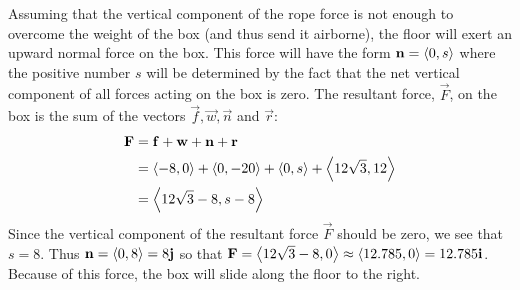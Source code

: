 \documentclass[handout]{ximera}
\begin{document}
\begin{example}[Example 6]
Assuming that the vertical component of the rope force is not enough to overcome the weight of the box (and thus send it airborne), 
the floor will exert an upward normal force on the box.  This force will have the form $\mathbf{n} = \left\langle 0, s\right\rangle$ where the positive 
number $s$ will be determined by the fact that the net vertical component of all forces acting on the box is zero. 
The resultant force, $\vec{F}$, on the box is the sum of the vectors $\vec{f}, \vec{w}, \vec{n}$ and $\vec{r}$:
\begin{align*}
\mathbf{F} &= \mathbf{f} + \mathbf{w} + \mathbf{n} +  \mathbf{r} \\
         &= \left\langle -8,0\right\rangle + \left\langle 0,-20\right\rangle +\left\langle 0,s\right\rangle + \left\langle 12\sqrt 3, 12\right\rangle \\
         &= \left\langle 12\sqrt 3 -8 , s-8\right\rangle
\end{align*}
Since the vertical component of the resultant force $\vec{F}$ should be zero, we see that $s = 8$. 
Thus $\mathbf{n} = \left\langle 0,8\right\rangle = 8\mathbf{j}$ so that $\mathbf{F} = \left\langle 12\sqrt 3 -8, 0\right\rangle \approx \left\langle 12.785,0\right\rangle = 12.785\mathbf{i}$. Because of this force, 
the box will slide along the floor to the right.





\end{example}
\end{document}
